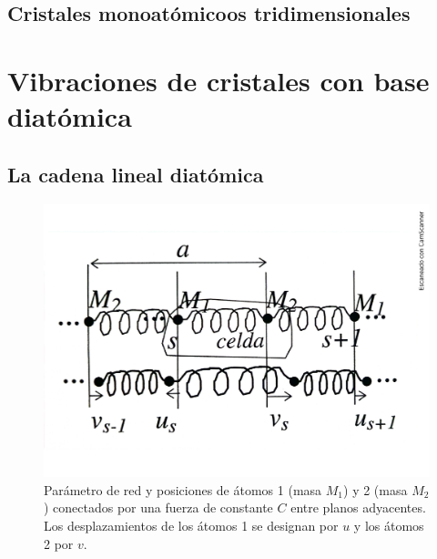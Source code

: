 \subsection{Cristales monoatómicoos tridimensionales}

\section{Vibraciones de cristales con base diatómica}


\subsection{La cadena lineal diatómica}
\begin{figure}[h!] \centering
    \includegraphics[scale=0.5]{Cuerpo/Ch_04/Fotos libro 4.pdf}
    \caption{Parámetro de red y posiciones de átomos 1 (masa $M_1$) y 2 (masa $M_2$) conectados por una fuerza de constante $C$ entre planos adyacentes. Los desplazamientos de los átomos 1 se designan por $u$ y los átomos 2 por $v$.}
    \label{Fig:04-04}
\end{figure}    

